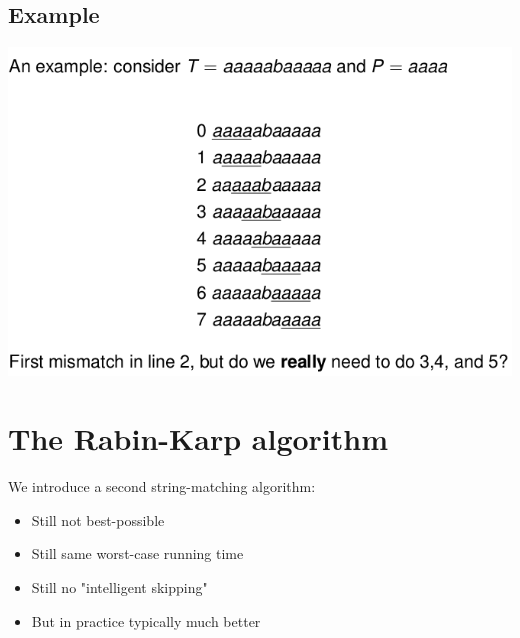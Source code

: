 \documentclass{article}[18pt]
\begin{document}
\subsection{Example}
\begin{center}
	\includegraphics[scale=0.7]{Example1}
\end{center}
\section{The Rabin-Karp algorithm}
We introduce a second string-matching algorithm:
\begin{itemize}
	\item Still not best-possible
	\item Still same worst-case running time
	\item Still no "intelligent skipping"
	\item But in practice typically much better
\end{itemize}
\end{document}
